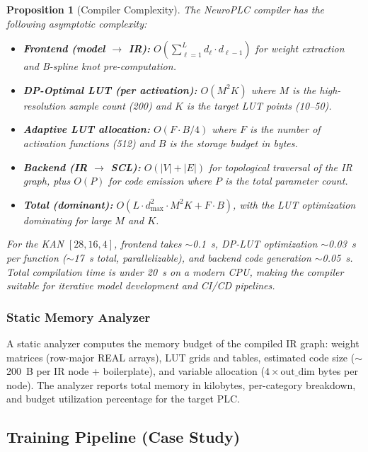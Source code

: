 \documentclass[journal,onecolumn]{IEEEtran}
\newcommand{\neuroplc}{NeuroPLC\xspace}
\newtheorem{proposition}{Proposition}
\begin{document}
\begin{proposition}[Compiler Complexity]
\label{prop:complexity}
The \neuroplc compiler has the following asymptotic complexity:

\begin{itemize}
    \item \textbf{Frontend (model $\to$ IR):} $O(\sum_{\ell=1}^L d_\ell \cdot d_{\ell-1})$ for weight extraction and B-spline knot pre-computation.
    \item \textbf{DP-Optimal LUT (per activation):} $O(M^2 K)$ where $M$ is the high-resolution sample count (200) and $K$ is the target LUT points (10--50).
    \item \textbf{Adaptive LUT allocation:} $O(F \cdot B/4)$ where $F$ is the number of activation functions (512) and $B$ is the storage budget in bytes.
    \item \textbf{Backend (IR $\to$ SCL):} $O(|V| + |E|)$ for topological traversal of the IR graph, plus $O(P)$ for code emission where $P$ is the total parameter count.
    \item \textbf{Total (dominant):} $O(L \cdot d_{\max}^2 \cdot M^2 K + F \cdot B)$, with the LUT optimization dominating for large $M$ and $K$.
\end{itemize}

For the KAN $[28,16,4]$, frontend takes $\sim$0.1~s, DP-LUT optimization
$\sim$0.03~s per function ($\sim$17~s total, parallelizable), and backend
code generation $\sim$0.05~s. Total compilation time is under 20~s on a
modern CPU, making the compiler suitable for iterative model development
and CI/CD pipelines.
\end{proposition}

\subsubsection{Static Memory Analyzer}

A static analyzer computes the memory budget of the compiled IR graph:
weight matrices (row-major REAL arrays), LUT grids and tables, estimated
code size ($\sim$200~B per IR node + boilerplate), and variable allocation
($4 \times \text{out\_dim}$ bytes per node). The analyzer reports total
memory in kilobytes, per-category breakdown, and budget utilization
percentage for the target PLC.

\subsection{Training Pipeline (Case Study)}
\end{document}

